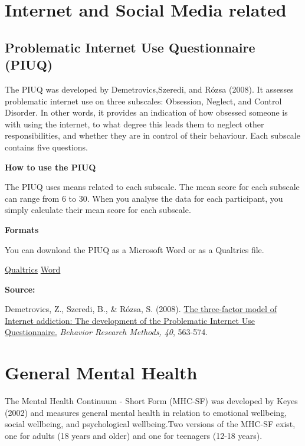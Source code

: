 \documentclass[
]{book}
\begin{document}
\hypertarget{internet-and-social-media-related}{%
\section{Internet and Social Media related}\label{internet-and-social-media-related}}

\hypertarget{problematic-internet-use-questionnaire-piuq}{%
\subsection{Problematic Internet Use Questionnaire (PIUQ)}\label{problematic-internet-use-questionnaire-piuq}}

The PIUQ was developed by Demetrovics,Szeredi, and Rózsa (2008). It assesses problematic internet use on three subscales: Obsession, Neglect, and Control Disorder. In other words, it provides an indication of how obsessed someone is with using the internet, to what degree this leads them to neglect other responsibilities, and whether they are in control of their behaviour. Each subscale contains five questions.

\textbf{How to use the PIUQ}

The PIUQ uses means related to each subscale. The mean score for each subscale can range from 6 to 30. When you analyse the data for each participant, you simply calculate their mean score for each subscale.

\textbf{Formats}

You can download the PIUQ as a Microsoft Word or as a Qualtrics file.

\href{questionnaires/ProblematicInternetUseQuestionnaire.qsf}{Qualtrics} \textbar{}
\href{questionnaires/ProblematicInternetUseQuestionnaire.docx}{Word}

\textbf{Source:}

Demetrovics, Z., Szeredi, B., \& Rózsa, S. (2008). \href{https://link.springer.com/content/pdf/10.3758/BRM.40.2.563}{The three-factor model of Internet addiction: The development of the Problematic Internet Use Questionnaire.} \emph{Behavior Research Methods, 40}, 563-574.

\hypertarget{general-mental-health}{%
\section{General Mental Health}\label{general-mental-health}}

The Mental Health Continuum - Short Form (MHC-SF) was developed by Keyes (2002) and measures general mental health in relation to emotional wellbeing, social wellbeing, and psychological wellbeing.Two versions of the MHC-SF exist, one for adults (18 years and older) and one for teenagers (12-18 years).
\end{document}

